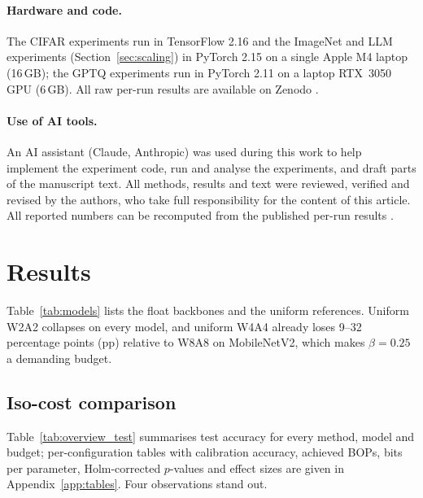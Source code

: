\documentclass[11pt,a4paper]{article}
\begin{document}
\paragraph{Hardware and code.} The CIFAR experiments run in TensorFlow 2.16 and the ImageNet and LLM experiments (Section~\ref{sec:scaling}) in PyTorch 2.15 on a single Apple M4 laptop
(16\,GB); the GPTQ experiments run in PyTorch 2.11 on a laptop RTX~3050 GPU (6\,GB). All raw per-run results are available on Zenodo \citep{AbcqResults}.

\paragraph{Use of AI tools.} An AI assistant (Claude, Anthropic) was used during this work to help
implement the experiment code, run and analyse the experiments, and draft parts of the manuscript text.
All methods, results and text were reviewed, verified and revised by the authors, who take full
responsibility for the content of this article. All reported numbers can be recomputed from the
published per-run results \citep{AbcqResults}.

\section{Results}
\label{sec:results}


Table~\ref{tab:models} lists the float backbones and the uniform references. Uniform W2A2 collapses
on every model, and uniform W4A4 already loses 9--32 percentage points (pp) relative to W8A8 on
MobileNetV2, which makes $\beta=0.25$ a demanding budget.

\subsection{Iso-cost comparison}
\label{sec:main_results}



Table~\ref{tab:overview_test} summarises test accuracy for every method, model and budget;
per-configuration tables with calibration accuracy, achieved BOPs, bits per parameter, Holm-corrected
$p$-values and effect sizes are given in Appendix~\ref{app:tables}. Four observations stand out.
\end{document}
